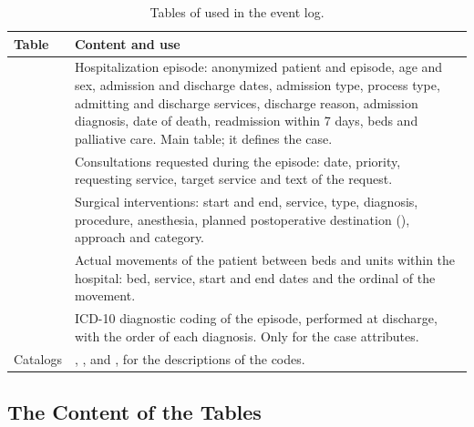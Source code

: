 \begin{table}[H]
\centering
\caption{Tables of  used in the event log.}
\label{tab:tablas}
\small
\begin{tabular}{L{4.7cm}L{8.9cm}}
\toprule
Table & Content and use \\
\midrule
{} & Hospitalization episode: anonymized patient and episode, age and sex, admission and discharge dates, admission type, process type, admitting and discharge services, discharge reason, admission diagnosis, date of death, readmission within 7 days, beds and palliative care. Main table; it defines the case. \\
 & Consultations requested during the episode: date, priority, requesting service, target service and text of the request. \\
 & Surgical interventions: start and end, service, type, diagnosis, procedure, anesthesia, planned postoperative destination (), approach and category. \\
 & Actual movements of the patient between beds and units within the hospital: bed, service, start and end dates and the ordinal of the movement. \\
 & ICD-10 diagnostic coding of the episode, performed at discharge, with the order of each diagnosis. Only for the case attributes. \\
Catalogs & , ,  and , for the descriptions of the codes. \\
\bottomrule
\end{tabular}
\end{table}

\subsection{The Content of the Tables}
\label{sec:contenido_tablas}

